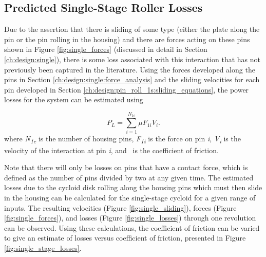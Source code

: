 \subsection{Predicted Single-Stage Roller Losses} \label{ch:design:pin_roll_1s:predicted_losses}

Due to the assertion that there is sliding of some type (either the plate along the pin or the pin rolling in the housing) and there are forces acting on these pins shown in Figure \ref{fig:single_forces} (discussed in detail in Section \ref{ch:design:single}), there is some loss associated with this interaction that has not previously been captured in the literature. Using the forces developed along the pins in Section \ref{ch:design:single:force_analysis} and the sliding velocities for each pin developed in Section \ref{ch:design:pin_roll_1s:sliding_equations}, the power losses for the system can be estimated using 

\begin{equation} \label{eq:single_power_loss}
P_L = \sum_{i=1}^{N_{1c}}\mu F_{1i} V_i.
\end{equation}
where \textit{N\textsubscript{1c}} is the number of housing pins, \textit{F\textsubscript{1i}} is the force on pin \textit{i}, \textit{V\textsubscript{i}} is the velocity of the interaction at pin \textit{i}, and \textmu\ is the coefficient of friction.

Note that there will only be losses on pins that have a contact force, which is defined as the number of pins divided by two at any given time. The estimated losses due to the cycloid disk rolling along the housing pins which must then slide in the housing can be calculated for the single-stage cycloid for a given range of inputs. The resulting velocities (Figure \ref{fig:single_sliding}), forces (Figure \ref{fig:single_forces}), and losses (Figure \ref{fig:single_losses}) through one revolution can be observed. Using these calculations, the coefficient of friction can be varied to give an estimate of losses versus coefficient of friction, presented in Figure \ref{fig:single_stage_losses}.

